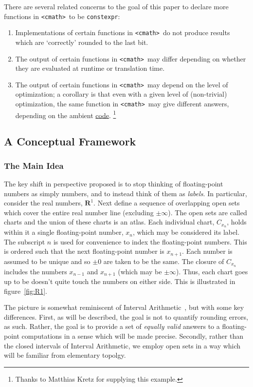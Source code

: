 \documentclass[prd,twocolumn,amsmath,amssymb,nofootinbib,eqsecnum]{revtex4-1}
\newcommand{\constexpr}{\code{constexpr}\xspace}
\newcommand{\code}[1]{{\tt #1}}
\newcommand{\header}[1]{{\tt <#1>}}
\newcommand{\cmath}{\header{cmath}}
\newcommand{\fig}[1]{figure~\ref{fig:#1}}
\begin{document}
There are several related concerns to the goal of this paper to declare more functions in \cmath\ to be \constexpr:
\begin{enumerate}
	\item Implementations of certain functions in \cmath\ do not produce results which are `correctly' rounded to the last bit.
	
	\item The output of certain functions in \cmath\ may differ depending on whether they are evaluated at runtime or translation time.
	
	\item The output of certain functions in \cmath\ may depend on the level of optimization; a corollary
	is that even with a given level of (non-trivial) optimization, the same function in \cmath\ may give 
	different answers, depending on the ambient \href{https://godbolt.org/z/js7rGvPbf}{code}.%
	\footnote{Thanks to Matthias Kretz for supplying this example.}
\end{enumerate}

\subsection{A Conceptual Framework}

\subsubsection{The Main Idea}

The key shift in perspective proposed is to stop thinking of floating-point numbers as simply numbers, and to instead think of them as {\it labels}. In particular, consider the real numbers, $\mathbf{R}^1$. Next define a sequence of overlapping open sets which cover the entire real number line (excluding $\pm \infty$). The open sets are called charts and the union of these charts is an atlas. Each individual chart, $C_{x_n}$, holds within it a single floating-point number, $x_n$, which may be considered its label. The subscript $n$ is used for convenience to index the floating-point numbers. This is ordered such that the next floating-point number is $x_{n+1}$. Each number is assumed to be unique and so $\pm 0$ are taken to be the same. The closure of 
$C_{x_n}$ includes the numbers $x_{n-1}$ and $x_{n+1}$ (which may be $\pm \infty$). Thus, each chart goes up to be doesn't quite touch the numbers on either side. This is illustrated in \fig{R1}.

The picture is somewhat reminiscent of Interval Arithmetic~\cite{Interval}, but with some key differences.
First, as will be described, the goal is not to quantify rounding errors, as such. Rather, the goal is to provide a set of \emph{equally valid} answers to a floating-point computations in a sense which will be made precise. Secondly, rather than the closed intervals of Interval Arithmetic, we employ open sets in a way which will be familiar from elementary topolgy.
\end{document}
